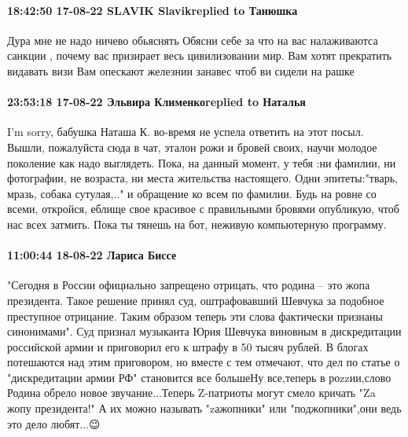  
 
 
 
 

\paragraph{18:42:50 17-08-22 SLAVIK Slavikreplied to Танюшка}

Дура мне не надо ничево обьяснять Обясни себе за что на вас налаживаютса
санкции , почему вас призирает весь цивилизовании мир. Вам хотят прекратить
видавать визи Вам опескают железнии занавес чтоб ви сидели на рашке

\paragraph{23:53:18 17-08-22 Эльвира Клименкоreplied to Наталья}

I'm sorry, бабушка Наташа К. во-время не успела ответить на этот посыл. Вышли,
пожалуйста сюда в чат, эталон рожи и бровей своих, научи молодое поколение как
надо выглядеть. Пока, на данный момент, у тебя :ни фамилии, ни фотографии, не
возраста, ни места жительства настоящего. Одни эпитеты:"тварь, мразь, собака
сутулая,.." и обращение ко всем по фамилии. Будь на ровне со всеми, откройся,
еблище свое красивое с правильными бровями опубликую, чтоб нас всех затмить.
Пока ты тянешь на бот, неживую компьютерную программу.

\paragraph{11:00:44 18-08-22 Лариса Биссе}

"Сегодня в России официально запрещено отрицать, что родина – это жопа
президента. Такое решение принял суд, оштрафовавший Шевчука за подобное
преступное отрицание. Таким образом теперь эти слова фактически признаны
синонимами". Суд признал музыканта Юрия Шевчука виновным в дискредитации
российской армии и приговорил его к штрафу в 50 тысяч рублей. В блогах
потешаются над этим приговором, но вместе с тем отмечают, что дел по статье о
"дискредитации армии РФ" становится все большеНу все,теперь в роzzии,слово
Родина обрело новое звучание...Теперь Z-патриоты могут смело кричать "Za жопу
президента!" А их можно называть "zажопники" или "поджопники",они ведь это дело
любят...😉🤣🤣🤣

